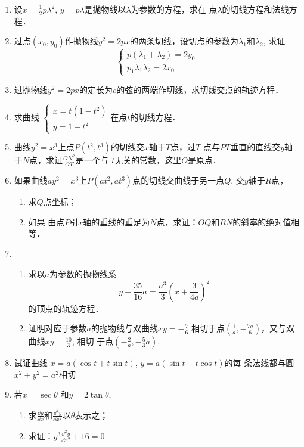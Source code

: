 \begin{ex}
\begin{enumerate}
    \item 设$x=\frac{1}{2}p\lambda^2$, $y=p\lambda$是抛物线以$\lambda$为参数的方程，求在
    点$\lambda$的切线方程和法线方程．
    \item 过点$(x_0,y_0)$作抛物线$y^2=2px$的两条切线，设切点的参数为$\lambda_1$和$\lambda_2$, 求证
    \[\begin{cases}
        p(\lambda_1+\lambda_2)=2y_0\\
        p_1\lambda_1\lambda_2=2x_0
    \end{cases}\]
    \item 过抛物线$y^2=2px$的定长为$c$的弦的两端作切线，求切线交点的轨迹方程．
    
    \item 求曲线
    $\begin{cases}
        x=t (1-t^2) \\ y=1+t^2
    \end{cases}$在点$t$的切线方程．

\item 曲线$y^2=x^3$上点$P(t^2,t^3)$的切线交$x$轴于$T$点，过$T$
点与$PT$垂直的直线交$y$轴于$N$点，求证$\frac{ON^2}{OT}$是一个与
$t$无关的常数，这里$O$是原点．
\item 如果曲线$ay^2=x^3$上$P(at^2,at^3)$点的切线交曲线于另一点$Q$, 交$y$轴于$R$点，
\begin{enumerate}
    \item 求$Q$点坐标；
    \item 如果
由点$P$引$x$轴的垂线的垂足为$N$点，求证：$OQ$和$RN$的斜率的绝对值相等．
\end{enumerate}
\item \begin{enumerate}
    \item 求以$a$为参数的抛物线系
\[y+\frac{35}{16}a=\frac{a^3}{3}\left(x+\frac{3}{4a}\right)^2\]
的顶点的轨迹方程．
\item 证明对应于参数$a$的抛物线与双曲线$xy=-\frac{7}{6}$ 
相切于点$\left(\frac{1}{a},-\frac{7a}{6}\right)$，又与双曲线$xy=\frac{10}{3}$, 相切
于点$\left(-\frac{2}{a},-\frac{5}{3}a\right)$.
\end{enumerate} 

\item 试证曲线
$x=a(\cos t+t\sin t)$, $y=a(\sin t-t\cos t)$的每
条法线都与圆$x^2+y^2=a^2$相切

\item 若$x=\sec\theta$ 和$y=2\tan\theta$,
\begin{enumerate}
    \item 求$\frac{\dd y}{\dd x}$和$\frac{\dd^2 y}{\dd x^2}$以$\theta$表示之；
\item 求证：$y^3\frac{\dd^2 y}{\dd x^2}+16=0$
\end{enumerate}


\end{enumerate}
\end{ex}
